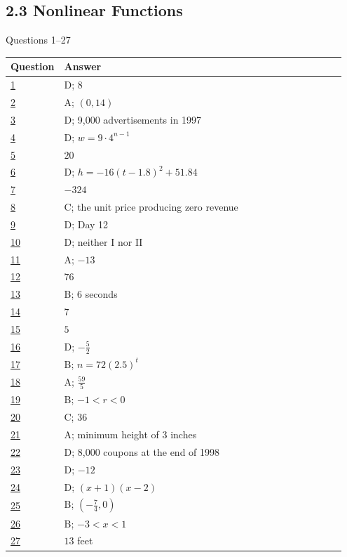 \documentclass[11pt]{article}
\begin{document}
\subsection*{2.3 Nonlinear Functions}
{\small\color{NPgray}Questions 1--27}\par
\renewcommand{\arraystretch}{1.25}\begin{longtable}{@{}p{0.09\linewidth}p{0.86\linewidth}@{}}\toprule Question & Answer \\ \midrule\endhead
\hyperref[q64]{1} & D; $8$\\
\hyperref[q65]{2} & A; $(0,14)$\\
\hyperref[q66]{3} & D; 9,000 advertisements in 1997\\
\hyperref[q67]{4} & D; $w=9\cdot4^{n-1}$\\
\hyperref[q68]{5} & $20$\\
\hyperref[q69]{6} & D; $h=-16(t-1.8)^2+51.84$\\
\hyperref[q70]{7} & $-324$\\
\hyperref[q71]{8} & C; the unit price producing zero revenue\\
\hyperref[q72]{9} & D; Day 12\\
\hyperref[q73]{10} & D; neither I nor II\\
\hyperref[q74]{11} & A; $-13$\\
\hyperref[q75]{12} & $76$\\
\hyperref[q76]{13} & B; $6$ seconds\\
\hyperref[q77]{14} & $7$\\
\hyperref[q78]{15} & $5$\\
\hyperref[q79]{16} & D; $-\frac52$\\
\hyperref[q80]{17} & B; $n=72(2.5)^t$\\
\hyperref[q81]{18} & A; $\frac{59}{5}$\\
\hyperref[q82]{19} & B; $-1<r<0$\\
\hyperref[q83]{20} & C; $36$\\
\hyperref[q84]{21} & A; minimum height of $3$ inches\\
\hyperref[q85]{22} & D; 8,000 coupons at the end of 1998\\
\hyperref[q86]{23} & D; $-12$\\
\hyperref[q87]{24} & D; $(x+1)(x-2)$\\
\hyperref[q88]{25} & B; $\left(-\frac74,0\right)$\\
\hyperref[q89]{26} & B; $-3<x<1$\\
\hyperref[q90]{27} & $13$ feet\\
\bottomrule\end{longtable}
\clearpage
\end{document}
